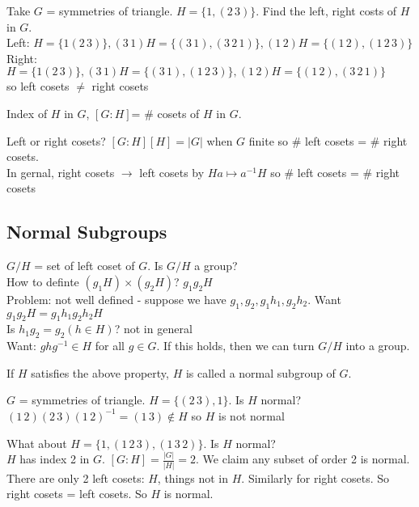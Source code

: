 \begin{example}
    Take $G$ = symmetries of triangle. $H = \{1, (2 \, 3)\}$. Find the left, right costs of $H$ in $G$. \\
    Left: $H = \{1 (2 \, 3)\}, (3 \, 1)H = \{(3 \, 1), (3 \, 2 \, 1)\}, (1 \, 2)H = \{(1 \, 2), (1 \, 2 \, 3)\}$ \\
    Right:  $H = \{1 (2 \, 3)\}, (3 \, 1)H = \{(3 \, 1), (1 \, 2 \, 3)\}, (1 \, 2)H = \{(1 \, 2), (3 \, 2 \, 1)\}$ \\
    so left cosets $\neq$ right cosets
\end{example}

\begin{definition}
    Index of $H$ in $G$, $[G:H]$= \# cosets of $H$ in $G$.
\end{definition}

\noindent
Left or right cosets? $[G:H][H] = |G|$ when $G$ finite so \# left cosets = \# right cosets. \\
In gernal, right cosets $\to$ left cosets by $Ha \mapsto a^{-1}H$ so \# left cosets = \# right cosets

\subsection{Normal Subgroups}

$G/H$ = set of left coset of $G$. Is $G/H$ a group? \\
How to definte $(g_1H) \times (g_2H)$? $g_1g_2H$ \\
Problem: not well defined - suppose we have $g_1, g_2, g_1h_1, g_2h_2$. Want $g_1g_2H = g_1h_1g_2h_2H$ \\
Is $h_1g_2 = g_2 (h \in H)$? not in general \\
Want: $ghg^{-1} \in H$ for all $g \in G$. If this holds, then we can turn $G/H$ into a group. 

\begin{definition}
    If $H$ satisfies the above property, $H$ is called a normal subgroup of $G$.
\end{definition}

\begin{example}
    $G$ = symmetries of triangle. $H = \{(2 \, 3), 1\}$. Is $H$ normal? \\
    $(1 \, 2)(2 \, 3)(1 \, 2)^{-1} = (1 \, 3) \not\in H$ so $H$ is not normal
\end{example}

What about $H = \{1, (1 \, 2 \, 3), (1 \, 3 \, 2)\}$. Is $H$ normal? \\
$H$ has index 2 in $G$. $[G:H] = \frac{|G|}{|H|}=2$. We claim any subset of order 2 is normal. \\
There are only 2 left cosets: $H$, things not in $H$. Similarly for right cosets. So right cosets = left cosets. So $H$ is normal. 

